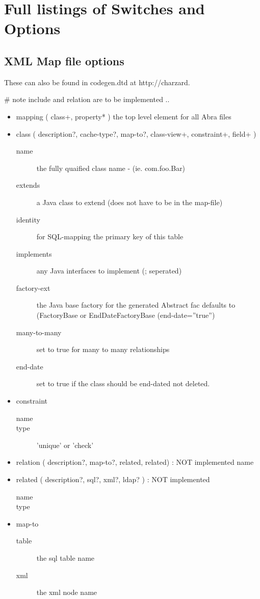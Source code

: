 \chapter {Full listings of Switches and Options}

\section{XML Map file options}
These can also be found in codegen.dtd at http://charzard.


\# note include and relation are to be implemented ..

\begin{itemize}
\item{mapping ( class+,  property* )}
the top level element for all Abra files

\item{class ( description?, cache-type?, map-to?, class-view+, constraint+, field+ )}
\begin{description}
\item[name] the fully quaified class name - (ie. com.foo.Bar)
\item[extends] a Java class to extend (does not have to be in the map-file)
\item[identity] for SQL-mapping the primary key of this table
\item[implements] any Java interfaces to implement (; seperated) 
\item[factory-ext] the Java base factory for the generated Abstract fac defaults to (FactoryBase or EndDateFactoryBase (end-date=''true'')
\item[many-to-many] set to true for many to many relationships
\item[end-date] set to true if the class should be end-dated not deleted.
\end{description}

\item{constraint}
\begin{description}
     \item[name] 
     \item[type] 'unique' or 'check'
\end{description}
\item{relation ( description?, map-to?, related, related) } : NOT implemented
      name        
\item{related ( description?, sql?, xml?, ldap? )} : NOT implemented
\begin{description}
    \item[name]
    \item[type] 
\end{description}
\item{ map-to}
\begin{description}
    \item[table] the sql table name
    \item[xml] the xml node name
\end{description}


\end{itemize}
